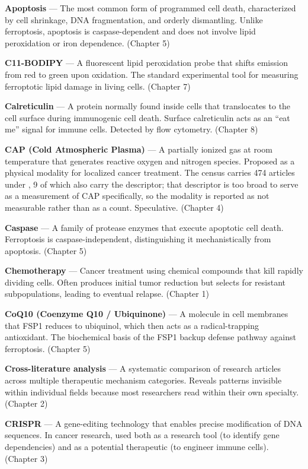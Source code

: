 \documentclass[11pt,twoside,openright]{report}
\begin{document}
\textbf{Apoptosis} --- The most common form of programmed cell death, characterized by cell shrinkage, DNA fragmentation, and orderly dismantling. Unlike ferroptosis, apoptosis is caspase-dependent and does not involve lipid peroxidation or iron dependence. (Chapter 5)

\textbf{C11-BODIPY} --- A fluorescent lipid peroxidation probe that shifts emission from red to green upon oxidation. The standard experimental tool for measuring ferroptotic lipid damage in living cells. (Chapter 7)

\textbf{Calreticulin} --- A protein normally found inside cells that translocates to the cell surface during immunogenic cell death. Surface calreticulin acts as an ``eat me'' signal for immune cells. Detected by flow cytometry. (Chapter 8)

\textbf{CAP (Cold Atmospheric Plasma)} --- A partially ionized gas at room temperature that generates reactive oxygen and nitrogen species. Proposed as a physical modality for localized cancer treatment. The census carries 474 articles under , 9 of which also carry the  descriptor; that descriptor is too broad to serve as a measurement of CAP specifically, so the modality is reported as not measurable rather than as a count. Speculative. (Chapter 4)

\textbf{Caspase} --- A family of protease enzymes that execute apoptotic cell death. Ferroptosis is caspase-independent, distinguishing it mechanistically from apoptosis. (Chapter 5)

\textbf{Chemotherapy} --- Cancer treatment using chemical compounds that kill rapidly dividing cells. Often produces initial tumor reduction but selects for resistant subpopulations, leading to eventual relapse. (Chapter 1)

\textbf{CoQ10 (Coenzyme Q10 / Ubiquinone)} --- A molecule in cell membranes that FSP1 reduces to ubiquinol, which then acts as a radical-trapping antioxidant. The biochemical basis of the FSP1 backup defense pathway against ferroptosis. (Chapter 5)

\textbf{Cross-literature analysis} --- A systematic comparison of research articles across multiple therapeutic mechanism categories. Reveals patterns invisible within individual fields because most researchers read within their own specialty. (Chapter 2)

\textbf{CRISPR} --- A gene-editing technology that enables precise modification of DNA sequences. In cancer research, used both as a research tool (to identify gene dependencies) and as a potential therapeutic (to engineer immune cells). (Chapter 3)
\end{document}
